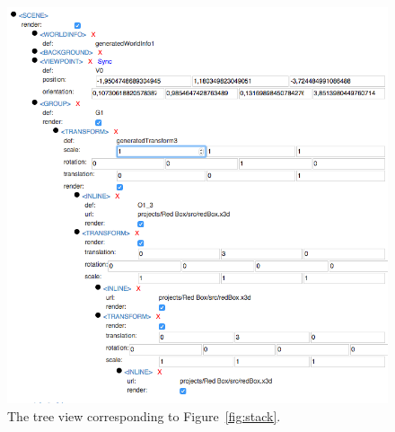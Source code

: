 \begin{figure}
  \centering
  \includegraphics[width=\textwidth]{../assets/stack-tree.png}
  \caption{The tree view corresponding to Figure~\ref{fig:stack}.}
  \label{fig:stack-tree}
\end{figure}

